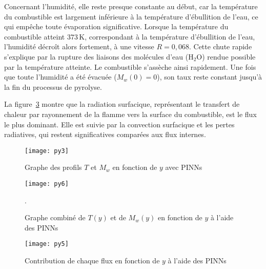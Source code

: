 \documentclass[12pt, oneside]{report} %
\theoremstyle{definition}
\theoremstyle{remark}
\begin{document}
Concernant l’humidité, elle reste presque constante au début, car la température du combustible est largement inférieure à la température d’ébullition de l’eau, ce qui empêche toute évaporation significative.  
Lorsque la température du combustible atteint $373\,\mathrm{K}$, correspondant à la température d’ébullition de l’eau, l’humidité décroît alors fortement, à une vitesse $R = 0{,}068$.  
Cette chute rapide s’explique par la rupture des liaisons des molécules d’eau ($\mathrm{H_2O}$) rendue possible par la température atteinte. Le combustible s’assèche ainsi rapidement.  
Une fois que toute l’humidité a été évacuée ($M_w(0) = 0$), son taux reste constant jusqu’à la fin du processus de pyrolyse.

La figure~\ref{fig:py5} montre que la radiation surfacique, représentant le transfert de chaleur par rayonnement de la flamme vers la surface du combustible, est le flux le plus dominant.  
Elle est suivie par la convection surfacique et les pertes radiatives, qui restent significatives comparées aux flux internes.  
	
		\clearpage
	\begin{figure}[]
		\centering
		\texttt{[image: py3]}
		\caption{Graphe des profils $T$ et $M_w$ en fonction de $y$ avec PINNs}
		\label{fig:py3}
	\end{figure}
	\begin{figure}[]
		\centering
		\texttt{[image: py6]}
		\caption{Graphe combiné de $T(y)$ et de $M_w(y)$ en fonction de $y$ à l'aide des PINNs}.
		\label{fig:py6}
	\end{figure}
	\begin{figure}[]
		\centering
		\texttt{[image: py5]}
		\caption{Contribution de chaque flux en fonction de $y$ à l'aide des PINNs}
		\label{fig:py5}
	\end{figure}
	\clearpage	
	
\end{document}
